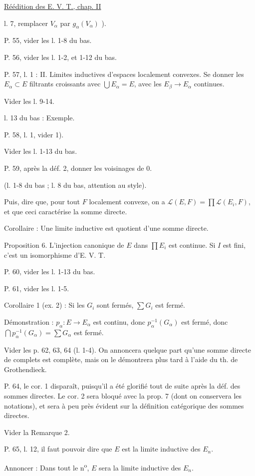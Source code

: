 \uline{Réédition des E. V. T., chap. II} 

l. 7, remplacer $V_\alpha$ par $g_\alpha(V_\alpha)$ ).

P. 55, vider les l. 1-8 du bas.

P. 56, vider les l. 1-2, et 1-12 du bas.

P. 57, l. 1 : II. Limites inductives d'espaces localement convexes. Se donner les $E_\alpha\subset E$ filtrants croissants avec $\bigcup E_\alpha=E$, avec les $E_\beta\longrightarrow E_\alpha$ continues.

Vider les l. 9-14.

l. 13 du bas : Exemple.

P. 58, l. 1, vider 1).

Vider les l. 1-13 du bas.

P. 59, après la déf. 2, donner les voisinages de 0.

(l. 1-8 du bas ; l. 8 du bas, attention au style).

Puis, dire que, pour tout $F$ localement convexe, on a $\mathcal{L}(E,F)=\prod\mathcal{L}(E_i,F)$, et que ceci caractérise la somme directe.

Corollaire : Une limite inductive est quotient d'une somme directe.

Proposition 6. L'injection canonique de $E$ dans $\prod E_i$ est continue. Si $I$ est fini, c'est un isomorphisme d'E. V. T.

P. 60, vider les l. 1-13 du bas.

P. 61, vider les l. 1-5.

Corollaire 1 (ex. 2) : Si les $G_i$ sont fermés, $\sum G_i$ est fermé.

Démonstration : $p_\alpha:E\longrightarrow E_\alpha$ est continu, donc $p_\alpha^{-1}(G_\alpha)$ est fermé, donc $\bigcap p_\alpha^{-1}(G_\alpha)=\sum G_\alpha$ est fermé.

Vider les p. 62, 63, 64 (l. 1-4). On annoncera quelque part qu'une somme directe de complets est complète, mais on le démontrera plus tard à l'aide du th. de Grothendieck.

P. 64, le cor. 1 disparaît, puisqu'il a été glorifié tout de suite après la déf. des sommes directes. Le cor. 2 sera bloqué avec la prop. 7 (dont on conservera les notations), et sera à peu près évident sur la définition catégorique des sommes directes.

Vider la Remarque 2.

P. 65, l. 12, il faut pouvoir dire que $E$ est la limite inductive des $E_n$.

Annoncer : Dans tout le n\textsuperscript{o}, $E$ sera la limite inductive des $E_n$.
